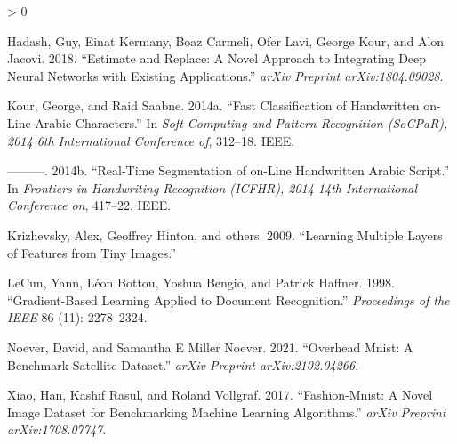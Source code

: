 \documentclass{article}
\newlength{\cslhangindent}
\newenvironment{CSLReferences}[2] %
 {%
  \setlength{\parindent}{0pt}
  \ifodd #1 \everypar{\setlength{\hangindent}{\cslhangindent}}\ignorespaces\fi
  \ifnum #2 > 0
  \setlength{\parskip}{#2\baselineskip}
  \fi
 }%
 {}
\begin{document}
\hypertarget{refs}{}
\begin{CSLReferences}{1}{0}
\leavevmode\hypertarget{ref-hadash2018estimate}{}%
Hadash, Guy, Einat Kermany, Boaz Carmeli, Ofer Lavi, George Kour, and
Alon Jacovi. 2018. {``Estimate and Replace: A Novel Approach to
Integrating Deep Neural Networks with Existing Applications.''}
\emph{arXiv Preprint arXiv:1804.09028}.

\leavevmode\hypertarget{ref-kour2014fast}{}%
Kour, George, and Raid Saabne. 2014a. {``Fast Classification of
Handwritten on-Line Arabic Characters.''} In \emph{Soft Computing and
Pattern Recognition (SoCPaR), 2014 6th International Conference of},
312--18. IEEE.

\leavevmode\hypertarget{ref-kour2014real}{}%
---------. 2014b. {``Real-Time Segmentation of on-Line Handwritten
Arabic Script.''} In \emph{Frontiers in Handwriting Recognition (ICFHR),
2014 14th International Conference on}, 417--22. IEEE.

\leavevmode\hypertarget{ref-krizhevsky2009learning}{}%
Krizhevsky, Alex, Geoffrey Hinton, and others. 2009. {``Learning
Multiple Layers of Features from Tiny Images.''}

\leavevmode\hypertarget{ref-lecun1998gradient}{}%
LeCun, Yann, Léon Bottou, Yoshua Bengio, and Patrick Haffner. 1998.
{``Gradient-Based Learning Applied to Document Recognition.''}
\emph{Proceedings of the IEEE} 86 (11): 2278--2324.

\leavevmode\hypertarget{ref-noever2021overhead}{}%
Noever, David, and Samantha E Miller Noever. 2021. {``Overhead Mnist: A
Benchmark Satellite Dataset.''} \emph{arXiv Preprint arXiv:2102.04266}.

\leavevmode\hypertarget{ref-xiao2017fashion}{}%
Xiao, Han, Kashif Rasul, and Roland Vollgraf. 2017. {``Fashion-Mnist: A
Novel Image Dataset for Benchmarking Machine Learning Algorithms.''}
\emph{arXiv Preprint arXiv:1708.07747}.

\end{CSLReferences}



\end{document}
